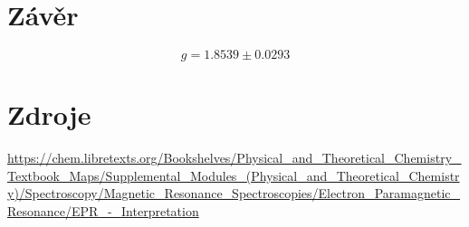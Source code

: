 \documentclass{article}
\begin{document}
\section{Závěr}
$$g = 1.8539 \pm 0.0293$$
\section{Zdroje}

\url{https://chem.libretexts.org/Bookshelves/Physical_and_Theoretical_Chemistry_Textbook_Maps/Supplemental_Modules_(Physical_and_Theoretical_Chemistry)/Spectroscopy/Magnetic_Resonance_Spectroscopies/Electron_Paramagnetic_Resonance/EPR_-_Interpretation}
\end{document}
